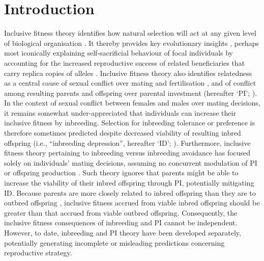 \documentclass[10pt,letterpaper]{article}
\begin{document}
\section*{Introduction}
Inclusive fitness theory identifies how natural selection will act at any given level of biological organisation \cite[][]{Grafen2006}. It thereby provides key evolutionary insights \cite[][]{Fisher2013, Bourke2014, Gardner2014, Liao2015}, perhaps most iconically explaining self-sacrificial behaviour of focal individuals by accounting for the increased reproductive success of related beneficiaries that carry replica copies of alleles \cite[][]{Hamilton1964, Hamilton1964a, Frank2013}. Inclusive fitness theory also identifies relatedness as a central cause of sexual conflict over mating and fertilisation \cite[][]{Parker2006}, and of conflict among resulting parents and offspring over parental investment (hereafter `PI'; \cite[][]{Trivers1972, Trivers1974, Kolliker2015}). In the context of sexual conflict between females and males over mating decisions, it remains somewhat under-appreciated that individuals can increase their inclusive fitness by inbreeding. Selection for inbreeding tolerance or preference is therefore sometimes predicted despite decreased viability of resulting inbred offspring (i.e., ``inbreeding depression'', hereafter `ID'; \cite[][]{Parker1979, Parker2006}). Furthermore, inclusive fitness theory pertaining to inbreeding versus inbreeding avoidance has focused solely on individuals' mating decisions, assuming no concurrent modulation of PI or offspring production \cite[][]{Parker2006, Kokko2006, Duthie2015a}. Such theory ignores that parents might be able to increase the viability of their inbred offspring through PI, potentially mitigating ID. Because parents are more closely related to inbred offspring than they are to outbred offspring \cite[][]{Trivers1974, Lynch1998, Reid2016}, inclusive fitness accrued from viable inbred offspring should be greater than that accrued from viable outbred offspring. Consequently, the inclusive fitness consequences of inbreeding and PI cannot be independent. However, to date, inbreeding and PI theory have been developed separately, potentially generating incomplete or misleading predictions concerning reproductive strategy.
\end{document}
